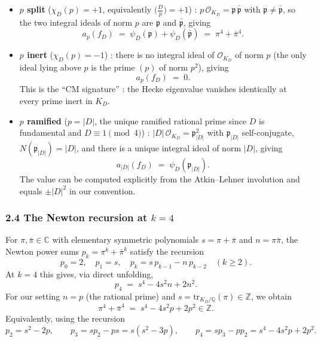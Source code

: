 \documentclass[
  11pt,
  a4paper,
]{amsart}
\begin{document}
\begin{itemize}
\item
  \textbf{\(p\) split} (\(\chi_D(p) = +1\), equivalently \(\bigl(\tfrac{D}{p}\bigr) = +1\)) : \(p\,\mathcal{O}_{K_D} = \mathfrak{p}\,\bar{\mathfrak{p}}\) with \(\mathfrak{p} \neq \bar{\mathfrak{p}}\), so the two integral ideals of norm \(p\) are \(\mathfrak{p}\) and \(\bar{\mathfrak{p}}\), giving
  \[
  a_p(f_D) \;=\; \psi_D(\mathfrak{p}) + \psi_D(\bar{\mathfrak{p}}) \;=\; \pi^4 + \bar\pi^4.
  \]
\item
  \textbf{\(p\) inert} (\(\chi_D(p) = -1\)) : there is no integral ideal of \(\mathcal{O}_{K_D}\) of norm \(p\) (the only ideal lying above \(p\) is the prime \((p)\) of norm \(p^2\)), giving
  \[
  a_p(f_D) \;=\; 0.
  \]
  This is the ``CM signature'' : the Hecke eigenvalue vanishes identically at every prime inert in \(K_D\).
\item
  \textbf{\(p\) ramified} (\(p = |D|\), the unique ramified rational prime since \(D\) is fundamental and \(D \equiv 1 \pmod 4\)) : \(|D|\,\mathcal{O}_{K_D} = \mathfrak{p}_{|D|}^2\) with \(\mathfrak{p}_{|D|}\) self-conjugate, \(N(\mathfrak{p}_{|D|}) = |D|\), and there is a unique integral ideal of norm \(|D|\), giving
  \[
  a_{|D|}(f_D) \;=\; \psi_D(\mathfrak{p}_{|D|}).
  \]
  The value can be computed explicitly from the Atkin--Lehner involution and equals \(\pm |D|^2\) in our convention.
\end{itemize}

\hypertarget{the-newton-recursion-at-k-4}{%
\subsubsection{\texorpdfstring{2.4 The Newton recursion at \(k = 4\)}{2.4 The Newton recursion at k = 4}}\label{the-newton-recursion-at-k-4}}

For \(\pi, \bar\pi \in \mathbb{C}\) with elementary symmetric polynomials \(s = \pi + \bar\pi\) and \(n = \pi\bar\pi\), the Newton power sums \(p_k = \pi^k + \bar\pi^k\) satisfy the recursion
\[
p_0 = 2, \quad p_1 = s, \quad p_k = s\, p_{k-1} - n\, p_{k-2} \quad (k \geq 2).
\]
At \(k = 4\) this gives, via direct unfolding,
\[
p_4 \;=\; s^4 - 4 s^2 n + 2 n^2.
\]
For our setting \(n = p\) (the rational prime) and \(s = \mathrm{tr}_{K_D/\mathbb{Q}}(\pi) \in \mathbb{Z}\), we obtain
\[
\pi^4 + \bar\pi^4 \;=\; s^4 - 4 s^2 p + 2 p^2 \in \mathbb{Z}.
\]
Equivalently, using the recursion
\[
p_2 = s^2 - 2 p, \qquad p_3 = s p_2 - p s = s(s^2 - 3p), \qquad p_4 = s p_3 - p p_2 = s^4 - 4 s^2 p + 2 p^2.
\]
\end{document}
